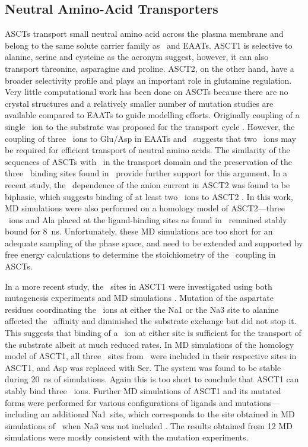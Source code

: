 \subsection{Neutral Amino-Acid Transporters}
ASCTs transport small neutral amino acid across the plasma membrane and belong 
to the same solute carrier family as \GltPh\ and EAATs. ASCT1 is selective to 
alanine, serine and cysteine as the acronym suggest, however, it can also 
transport threonine, asparagine and proline. ASCT2, on the other hand, have a 
broader selectivity profile and plays an important role in glutamine regulation. 
Very little computational work has been done on ASCTs because there are no 
crystal structures and a relatively smaller number of mutation studies are 
available compared to EAATs to guide modelling efforts. Originally coupling 
of a single \Na\ ion to the substrate was proposed for the transport cycle 
\cite{Broer2000,Grewer2004}. However, the coupling of three \Na\ ions to Glu/Asp 
in EAATs and \GltPh\ suggests that two \Na\ ions may be required for 
efficient transport of neutral amino acids. The similarity of the sequences of 
ASCTs with \GltPh\ in the transport domain and the preservation of the 
three \Na\ binding sites found in \GltPh\ provide further support for this 
argument. In a recent study, the \Na\ dependence of the anion current in ASCT2 
was found to be biphasic, which suggests binding of at least two \Na\ ions to 
ASCT2 \cite{Zander2013}. In this work, MD simulations were also performed on 
a homology model of ASCT2---three \Na\ ions and Ala placed at the ligand-binding 
sites as found in \GltPh\ remained stably bound for 8~ns. Unfortunately, these 
MD simulations are too short for an adequate sampling of the phase space, and 
need to be extended and supported by free energy calculations to determine the 
stoichiometry of the \Na\ coupling in ASCTs. 

In a more recent study, the \Na\ sites in ASCT1 were investigated using both 
mutagenesis experiments and MD simulations \cite{Scopelliti2014}. Mutation of 
the aspartate residues coordinating the \Na\ ions at either the Na1 or the Na3 
site to alanine affected the \Na\ affinity and diminished the substrate 
exchange but did not stop it. This suggests that binding of a \Na\ ion at 
either site is sufficient for the transport of the substrate albeit at much 
reduced rates. In MD simulations of the homology model of ASCT1, all three 
\Na\ sites from \GltPh\ were included in their respective sites in ASCT1, and 
Asp was replaced with Ser. The system was found to be stable during 20~ns of 
simulations. Again this is too short to conclude that ASCT1 can stably bind 
three \Na\ ions. Further MD simulations of ASCT1 and its mutated forms were 
performed for various configurations of ligands and mutations---including an 
additional Na1\prim\ site, which corresponds to the site obtained in MD 
simulations of \GltPh\ when Na3 was not included \cite{Bastug2012}. The 
results obtained from 12 MD simulations were mostly consistent with the 
mutation experiments.

